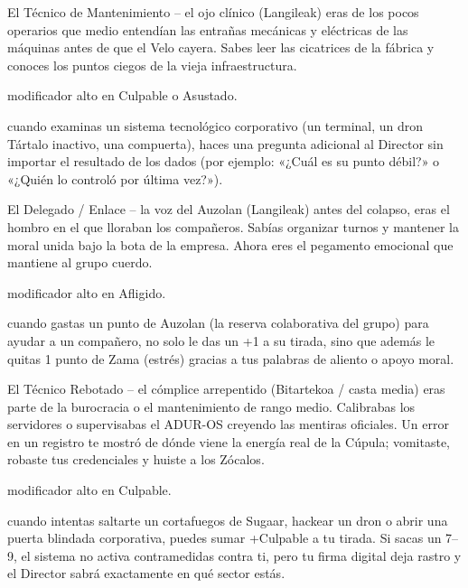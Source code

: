 \begin{FichaArquetipo}{El Técnico de Mantenimiento -- el ojo clínico (Langileak)}
 eras de los pocos operarios que medio entendían las entrañas mecánicas y eléctricas de las máquinas antes de que el Velo cayera. Sabes leer las cicatrices de la fábrica y conoces los puntos ciegos de la vieja infraestructura.\par
{} modificador alto en Culpable o Asustado.\par
{} cuando examinas un sistema tecnológico corporativo (un terminal, un dron Tártalo inactivo, una compuerta), haces una pregunta adicional al Director sin importar el resultado de los dados (por ejemplo: «¿Cuál es su punto débil?» o «¿Quién lo controló por última vez?»).
\end{FichaArquetipo}

\begin{FichaArquetipo}{El Delegado / Enlace -- la voz del Auzolan (Langileak)}
 antes del colapso, eras el hombro en el que lloraban los compañeros. Sabías organizar turnos y mantener la moral unida bajo la bota de la empresa. Ahora eres el pegamento emocional que mantiene al grupo cuerdo.\par
{} modificador alto en Afligido.\par
{} cuando gastas un punto de Auzolan (la reserva colaborativa del grupo) para ayudar a un compañero, no solo le das un +1 a su tirada, sino que además le quitas 1 punto de Zama (estrés) gracias a tus palabras de aliento o apoyo moral.
\end{FichaArquetipo}

\begin{FichaArquetipo}{El Técnico Rebotado -- el cómplice arrepentido (Bitartekoa / casta media)}
 eras parte de la burocracia o el mantenimiento de rango medio. Calibrabas los servidores o supervisabas el ADUR-OS creyendo las mentiras oficiales. Un error en un registro te mostró de dónde viene la energía real de la Cúpula; vomitaste, robaste tus credenciales y huiste a los Zócalos.\par
{} modificador alto en Culpable.\par
{} cuando intentas saltarte un cortafuegos de Sugaar, hackear un dron o abrir una puerta blindada corporativa, puedes sumar +Culpable a tu tirada. Si sacas un 7--9, el sistema no activa contramedidas contra ti, pero tu firma digital deja rastro y el Director sabrá exactamente en qué sector estás.
\end{FichaArquetipo}

